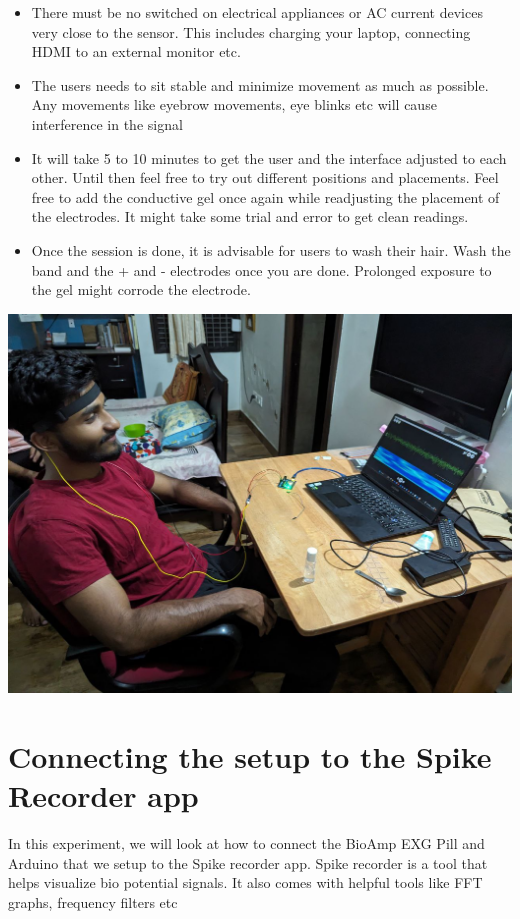 \documentclass[
  letterpaper,
  DIV=11,
  numbers=noendperiod]{scrreprt}
\begin{document}
\begin{itemize}
\item
  There must be no switched on electrical appliances or AC current
  devices very close to the sensor. This includes charging your laptop,
  connecting HDMI to an external monitor etc.
\item
  The users needs to sit stable and minimize movement as much as
  possible. Any movements like eyebrow movements, eye blinks etc will
  cause interference in the signal
\item
  It will take 5 to 10 minutes to get the user and the interface
  adjusted to each other. Until then feel free to try out different
  positions and placements. Feel free to add the conductive gel once
  again while readjusting the placement of the electrodes. It might take
  some trial and error to get clean readings.
\item
  Once the session is done, it is advisable for users to wash their
  hair. Wash the band and the + and - electrodes once you are done.
  Prolonged exposure to the gel might corrode the electrode.
\end{itemize}

\includegraphics{images/clipboard-2267831741.png}

\chapter{Connecting the setup to the Spike Recorder
app}\label{connecting-the-setup-to-the-spike-recorder-app}

In this experiment, we will look at how to connect the BioAmp EXG Pill
and Arduino that we setup to the Spike recorder app. Spike recorder is a
tool that helps visualize bio potential signals. It also comes with
helpful tools like FFT graphs, frequency filters etc
\end{document}
